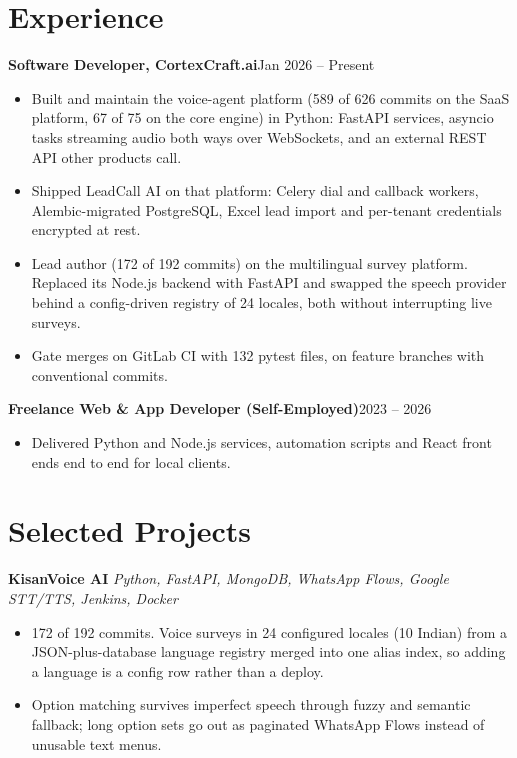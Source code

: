 \documentclass[10pt,a4paper]{article}
\newcommand{\entry}[2]{\textbf{#1}\hfill{#2}\par}
\begin{document}
\section{Experience}
\entry{Software Developer, CortexCraft.ai}{Jan 2026 -- Present}
\begin{itemize}
  \item Built and maintain the voice-agent platform (589 of 626 commits on the SaaS platform, 67 of 75
        on the core engine) in Python: FastAPI services, asyncio tasks streaming audio both ways over
        WebSockets, and an external REST API other products call.
  \item Shipped LeadCall AI on that platform: Celery dial and callback workers, Alembic-migrated
        PostgreSQL, Excel lead import and per-tenant credentials encrypted at rest.
  \item Lead author (172 of 192 commits) on the multilingual survey platform. Replaced its Node.js
        backend with FastAPI and swapped the speech provider behind a config-driven registry of 24
        locales, both without interrupting live surveys.
  \item Gate merges on GitLab CI with 132 pytest files, on feature branches with conventional commits.
\end{itemize}

\vspace{1pt}
\entry{Freelance Web \& App Developer (Self-Employed)}{2023 -- 2026}
\begin{itemize}
  \item Delivered Python and Node.js services, automation scripts and React front ends end to end for local clients.
\end{itemize}

\section{Selected Projects}
\textbf{KisanVoice AI} \textit{Python, FastAPI, MongoDB, WhatsApp Flows, Google STT/TTS, Jenkins, Docker}
\begin{itemize}
  \item 172 of 192 commits. Voice surveys in 24 configured locales (10 Indian) from a JSON-plus-database
        language registry merged into one alias index, so adding a language is a config row rather
        than a deploy.
  \item Option matching survives imperfect speech through fuzzy and semantic fallback; long option
        sets go out as paginated WhatsApp Flows instead of unusable text menus.
\end{itemize}
\end{document}
